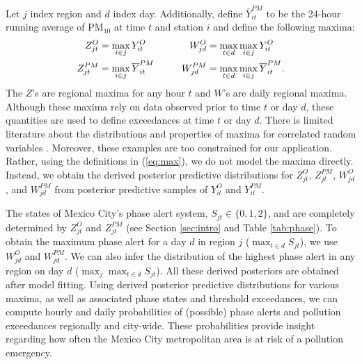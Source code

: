 \documentclass[alpha-refs]{wiley-article}
\begin{document}
Let $j$ index region and $d$ index day. Additionally, define $\overline{Y}_{it}^{PM}$ to be the 24-hour running average of $\text{PM}_{10}$ at time $t$ and station $i$
and define the following maxima:
\begin{equation}\label{eq:max}
\begin{aligned}[c]
Z_{jt}^{O} &= \max_{i \in j} Y_{it}^{O}  \\
Z_{jt}^{PM} &= \max_{i \in j} \overline{Y}_{it}^{PM}
\end{aligned}
\hspace{10mm}
\begin{aligned}[c]
W_{jd}^{O} &= \max_{t \in d} \max_{i \in j} Y_{it}^{O} \\
W_{jd}^{PM} &= \max_{t \in d}\max_{i \in j} \overline{Y}_{it}^{PM}.
\end{aligned}
\end{equation}
The $Z$'s are regional maxima for any hour $t$ and $W$'s are daily regional maxima. Although these maxima rely on data observed prior to time $t$ or day $d$, these quantities are used to define exceedances at time $t$ or day $d$.
There is limited literature about the distributions and properties of maxima for correlated random variables \citep[see][]{gupta1985,ho1996}. Moreover, these examples are too constrained for our application.
Rather, using the definitions in (\ref{eq:max}), we do not model the maxima directly.  Instead, we obtain the derived posterior predictive distributions for $Z_{jt}^{O}$, $Z_{jt}^{PM}$, $W_{jd}^{O}$, and $W_{jd}^{PM}$ from posterior predictive samples of $Y_{it}^{O}$ and $Y_{it}^{PM}$.

The states of Mexico City's phase alert system, $S_{jt} \in \{0,1,2\}$, and are completely determined by $Z_{jt}^{O}$ and $Z_{jt}^{PM}$ (see Section \ref{sec:intro} and Table \ref{tab:phase}). To obtain the maximum phase alert for a day $d$ in region $j$ ($\max_{t \in d} S_{jt}$), we use $W_{jd}^{O}$ and $W_{jd}^{PM}$. We can also infer the distribution of the highest phase alert in any region on day $d$ ($ \max_{j} \max_{t \in d} S_{jt}$). All these derived posteriors are obtained after model fitting. Using derived posterior predictive distributions for various maxima, as well as associated phase states and threshold exceedances, we can compute hourly and daily probabilities of (possible) phase alerts and pollution exceedances regionally and city-wide. These probabilities provide insight regarding how often the Mexico City metropolitan area is at risk of a pollution emergency.
\end{document}

